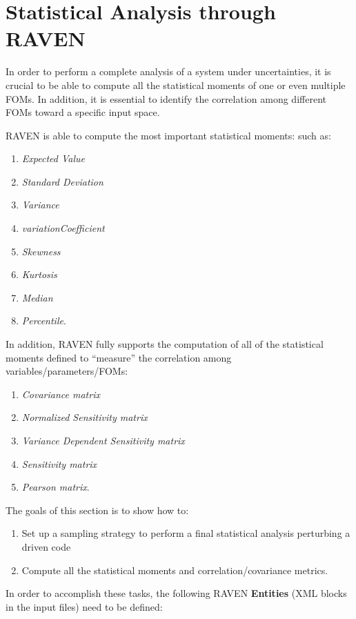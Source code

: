 \section{Statistical Analysis through RAVEN}
\label{sec:SAraven}
In order to perform a complete analysis of a system under uncertainties,
it is crucial to be able to compute all the statistical moments of one or even multiple
FOMs. In addition, it is essential to identify the correlation
among different FOMs toward a specific input space.

RAVEN is able to compute the most important statistical moments:
such as:
\begin{enumerate}
  \item \textit{Expected Value}
  \item \textit{Standard Deviation}
  \item \textit{Variance}
  \item \textit{variationCoefficient}
  \item \textit{Skewness}
  \item \textit{Kurtosis}
  \item \textit{Median}
  \item \textit{Percentile}.
\end{enumerate}
In addition, RAVEN fully supports the computation of all of the statistical moments defined to
``measure'' the correlation among variables/parameters/FOMs:
\begin{enumerate}
  \item \textit{Covariance matrix}
  \item \textit{Normalized Sensitivity matrix}
  \item \textit{Variance Dependent Sensitivity matrix}
  \item \textit{Sensitivity matrix}
  \item \textit{Pearson matrix}.
\end{enumerate}
The goals of this section is to show how to:
 \begin{enumerate}
   \item Set up a sampling strategy to perform a final statistical analysis
   perturbing a driven code
   \item Compute all the statistical moments and correlation/covariance
   metrics.
\end{enumerate}
In order to accomplish these tasks, the following RAVEN \textbf{Entities} (XML blocks in the input files) need to be defined:
